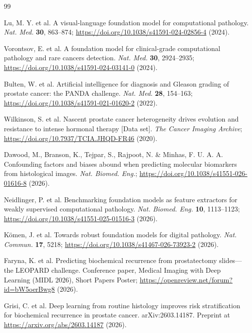 \begin{thebibliography}{99}

 Lu, M. Y. et al. A visual-language foundation model for
computational pathology. \textit{Nat. Med.} \textbf{30}, 863--874;
\url{https://doi.org/10.1038/s41591-024-02856-4} (2024).

 Vorontsov, E. et al. A foundation model for clinical-grade
computational pathology and rare cancers detection. \textit{Nat. Med.} \textbf{30},
2924--2935; \url{https://doi.org/10.1038/s41591-024-03141-0} (2024).

 Bulten, W. et al. Artificial intelligence for diagnosis and
Gleason grading of prostate cancer: the PANDA challenge. \textit{Nat. Med.}
\textbf{28}, 154--163; \url{https://doi.org/10.1038/s41591-021-01620-2} (2022).

 Wilkinson, S. et al. Nascent prostate cancer heterogeneity
drives evolution and resistance to intense hormonal therapy [Data set].
\textit{The Cancer Imaging Archive};
\url{https://doi.org/10.7937/TCIA.JHQD-FR46} (2020).

 Dawood, M., Branson, K., Tejpar, S., Rajpoot, N. \& Minhas,
F. U. A. A. Confounding factors and biases abound when predicting molecular biomarkers
from histological images. \textit{Nat. Biomed. Eng.};
\url{https://doi.org/10.1038/s41551-026-01616-8} (2026).

 Neidlinger, P. et al. Benchmarking foundation models as
feature extractors for weakly supervised computational pathology. \textit{Nat. Biomed.
Eng.} \textbf{10}, 1113--1123;
\url{https://doi.org/10.1038/s41551-025-01516-3} (2026).

 K\"omen, J. et al. Towards robust foundation models for
digital pathology. \textit{Nat. Commun.} \textbf{17}, 5218;
\url{https://doi.org/10.1038/s41467-026-73923-2} (2026).

 Faryna, K. et al. Predicting biochemical recurrence from
prostatectomy slides---the LEOPARD challenge. Conference paper, Medical Imaging with
Deep Learning (MIDL 2026), Short Papers Poster;
\url{https://openreview.net/forum?id=bW5oerBwg8} (2026).

 Grisi, C. et al. Deep learning from routine histology improves
risk stratification for biochemical recurrence in prostate cancer. arXiv:2603.14187.
Preprint at \url{https://arxiv.org/abs/2603.14187} (2026).


\end{thebibliography}

